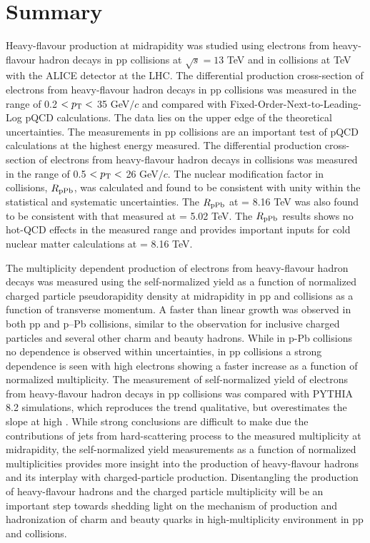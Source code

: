\section{Summary}\label{section:summary}
Heavy-flavour production at midrapidity was studied using electrons from heavy-flavour hadron decays in pp collisions at $\sqrt{s}=13$ TeV and in \pPb collisions at  TeV with the ALICE detector at the LHC. The \pt differential production cross-section of electrons from heavy-flavour hadron decays in pp collisions was measured in the range of 0.2 $<p_{\rm T}<$ 35 GeV$/c$ and compared with Fixed-Order-Next-to-Leading-Log pQCD calculations.
{The data lies on the upper edge of the theoretical uncertainties.} The measurements in pp collisions are an important test of pQCD calculations at the highest energy measured. The \pt differential production cross-section of electrons from heavy-flavour hadron decays in \pPb collisions was measured in the range of 0.5 $<p_{\rm T}<$ 26 GeV$/c$. The nuclear modification factor in \pPb collisions, $R_{\rm{pPb}}$, was calculated and found to be consistent with unity within the statistical and systematic uncertainties. The $R_{\rm{pPb}}$ at \sqrtsNN = 8.16 TeV was also found to be consistent with that measured at \sqrtsNN = 5.02 TeV. The $R_{\rm{pPb}}$ results shows no hot-QCD effects in the measured \pt range and provides important inputs for cold nuclear matter calculations at \sqrtsNN = 8.16 TeV. 

The multiplicity dependent production of electrons from heavy-flavour hadron decays was measured using the self-normalized yield  as a function of normalized charged particle pseudorapidity density at midrapidity in pp and \pPb collisions as a function of transverse momentum. A faster than linear growth was observed in both pp and p--Pb collisions, similar to the observation for inclusive charged particles and several other charm and beauty hadrons. While in p-Pb collisions no \pt dependence is observed within uncertainties, in pp collisions a strong \pt dependence is seen with high \pt electrons showing a faster increase as a function of normalized multiplicity. The measurement of self-normalized yield of electrons from heavy-flavour hadron decays in pp collisions was compared with PYTHIA 8.2 simulations, which reproduces the trend qualitative, but overestimates the slope at high \pt. While strong conclusions are difficult to make due the contributions of jets from hard-scattering process to the measured multiplicity at midrapidity, the self-normalized yield measurements as a function of normalized multiplicities provides more insight into the production of heavy-flavour hadrons and its interplay with charged-particle production.  Disentangling the production of heavy-flavour hadrons and the charged particle multiplicity will be an important step towards shedding light on the mechanism of production and hadronization of charm and beauty quarks in high-multiplicity environment in pp and \pPb collisions. 

